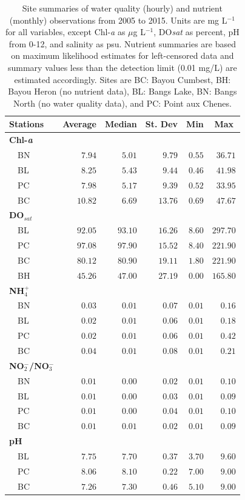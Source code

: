 \documentclass[letterpaper,12pt]{article}\usepackage[]{graphicx}\usepackage[]{color}
\begin{document}
\setcounter{table}{1}
\begin{table}[!tbp]
\caption{Site summaries of water quality (hourly) and nutrient (monthly) observations from 2005 to 2015.  Units are mg L$^{-1}$ for all variables, except Chl-\textit{a} as $\mu$g L$^{-1}$, DO\textit{sat} as percent, pH from 0-12, and salinity as psu. Nutrient summaries are based on maximum likelihood estimates for left-censored data and summary values less than the detection limit (0.01 mg/L) are estimated accordingly.  Sites are BC: Bayou Cumbest, BH: Bayou Heron (no nutrient data), BL: Bangs Lake, BN: Bangs North (no water quality data), and PC: Point aux Chenes.\label{tab:summtab}} 
\begin{center}
\begin{tabular}{lrrrrr}
\hline\hline
\multicolumn{1}{l}{Stations}&\multicolumn{1}{c}{Average}&\multicolumn{1}{c}{Median}&\multicolumn{1}{c}{St. Dev}&\multicolumn{1}{c}{Min}&\multicolumn{1}{c}{Max}\tabularnewline
\hline
{\bfseries Chl-\textit{a}}&&&&&\tabularnewline
~~BN&$ 7.94$&$ 5.01$&$ 9.79$&$0.55$&$ 36.71$\tabularnewline
~~BL&$ 8.25$&$ 5.43$&$ 9.44$&$0.46$&$ 41.98$\tabularnewline
~~PC&$ 7.98$&$ 5.17$&$ 9.39$&$0.52$&$ 33.95$\tabularnewline
~~BC&$10.82$&$ 6.69$&$13.76$&$0.69$&$ 47.67$\tabularnewline
\hline
{\bfseries DO$_{sat}$}&&&&&\tabularnewline
~~BL&$92.05$&$93.10$&$16.26$&$8.60$&$297.70$\tabularnewline
~~PC&$97.08$&$97.90$&$15.52$&$8.40$&$221.90$\tabularnewline
~~BC&$80.12$&$80.90$&$19.11$&$1.80$&$221.90$\tabularnewline
~~BH&$45.26$&$47.00$&$27.19$&$0.00$&$165.80$\tabularnewline
\hline
{\bfseries NH$_4^+$}&&&&&\tabularnewline
~~BN&$ 0.03$&$ 0.01$&$ 0.07$&$0.01$&$  0.16$\tabularnewline
~~BL&$ 0.02$&$ 0.01$&$ 0.06$&$0.01$&$  0.18$\tabularnewline
~~PC&$ 0.02$&$ 0.01$&$ 0.06$&$0.01$&$  0.42$\tabularnewline
~~BC&$ 0.04$&$ 0.01$&$ 0.08$&$0.01$&$  0.21$\tabularnewline
\hline
{\bfseries NO$_2^-$/NO$_3^-$}&&&&&\tabularnewline
~~BN&$ 0.01$&$ 0.00$&$ 0.02$&$0.01$&$  0.10$\tabularnewline
~~BL&$ 0.01$&$ 0.00$&$ 0.03$&$0.01$&$  0.09$\tabularnewline
~~PC&$ 0.01$&$ 0.00$&$ 0.04$&$0.01$&$  0.10$\tabularnewline
~~BC&$ 0.01$&$ 0.01$&$ 0.02$&$0.01$&$  0.09$\tabularnewline
\hline
{\bfseries pH}&&&&&\tabularnewline
~~BL&$ 7.75$&$ 7.70$&$ 0.37$&$3.70$&$  9.60$\tabularnewline
~~PC&$ 8.06$&$ 8.10$&$ 0.22$&$7.00$&$  9.00$\tabularnewline
~~BC&$ 7.26$&$ 7.30$&$ 0.46$&$5.10$&$  9.00$\tabularnewline

\end{tabular}
\end{center}
\end{table}
\end{document}
